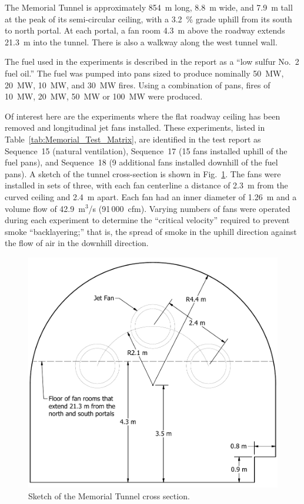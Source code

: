 The Memorial Tunnel is approximately 854~m long, 8.8~m wide, and 7.9~m tall at the peak of its semi-circular ceiling, with a 3.2~\% grade uphill from its south to north portal. At each portal, a fan room 4.3~m above the roadway extends 21.3~m into the tunnel. There is also a walkway along the west tunnel wall.

The fuel used in the experiments is described in the report as a ``low sulfur No.~2 fuel oil.'' The fuel was pumped into pans sized to produce nominally 50~MW, 20~MW, 10~MW, and 30~MW fires. Using a combination of pans, fires of 10~MW, 20~MW, 50~MW or 100~MW were produced.

Of interest here are the experiments where the flat roadway ceiling has been removed and longitudinal jet fans installed. These experiments, listed in Table~\ref{tab:Memorial_Test_Matrix}, are identified in the test report as Sequence~15 (natural ventilation), Sequence~17 (15 fans installed uphill of the fuel pans), and Sequence~18 (9 additional fans installed downhill of the fuel pans). A sketch of the tunnel cross-section is shown in Fig.~\ref{Memorial_Tunnel_Cross_Section}.  The fans were installed in sets of three, with each fan centerline a distance of 2.3~m from the curved ceiling and 2.4~m apart. Each fan had an inner diameter of 1.26~m and a volume flow of 42.9~m$^3$/s (91\,000~cfm). Varying numbers of fans were operated during each experiment to determine the ``critical velocity'' required to prevent smoke ``backlayering;'' that is, the spread of smoke in the uphill direction against the flow of air in the downhill direction.

\begin{figure}[!ht]
\centering
\includegraphics[width=5in]{FIGURES/Memorial_Tunnel/section}
\caption[Memorial Tunnel cross section]{Sketch of the Memorial Tunnel cross section.}
\label{Memorial_Tunnel_Cross_Section}
\end{figure}

